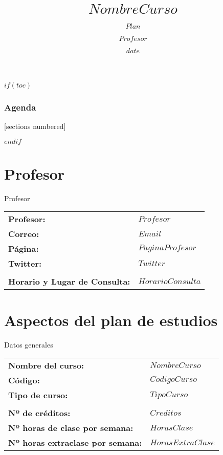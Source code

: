 \documentclass[10pt]{beamer}
\title{$NombreCurso$}
\subtitle{$Plan$}
\author{$Profesor$}
\date{$date$}
\institute{$Instituto$}
\let\oldtextbf\textbf
\renewcommand{\textbf}[1]{\textcolor{alerted text.fg}{\oldtextbf{#1}}}
\begin{document}
\spanishsignitems

\maketitle

$if(toc)$

\begin{frame}
  \frametitle{Agenda}
  [sections numbered]
  \tableofcontents[hideallsubsections]
\end{frame}

$endif$

\section{Profesor}

\begin{frame}{Profesor}

  \begin{tabularx}{\textwidth}{p{3cm}p{10cm}}
        \textbf{Profesor:}                  & $Profesor$         \\
        \textbf{Correo:}                            & $Email$         \\
        \textbf{Página:}                     & $PaginaProfesor$           \\
        \textbf{Twitter:}                     & $Twitter$           \\
                                                    &                       \\
        \textbf{Horario y Lugar de Consulta:}       & $HorarioConsulta$            \\
    \end{tabularx}

\end{frame}

\section{Aspectos del plan de estudios}

\begin{frame}{Datos generales}

  \begin{tabularx}{\textwidth}{p{6cm}p{10cm}}
        \textbf{Nombre del curso:}                  & $NombreCurso$         \\
        \textbf{Código:}                            & $CodigoCurso$         \\
        \textbf{Tipo de curso:}                     & $TipoCurso$           \\
                                                    &                       \\
        \textbf{Nº de créditos:}                    & $Creditos$            \\
        \textbf{Nº horas de clase por semana:}      & $HorasClase$          \\
        \textbf{Nº horas extraclase por semana:}    & $HorasExtraClase$     \\
    \end{tabularx}

\end{frame}
\end{document}
